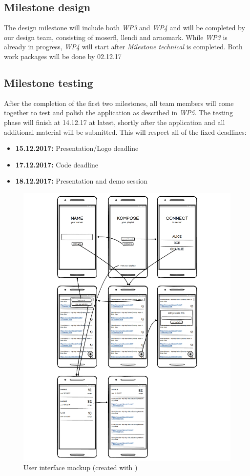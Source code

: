 \documentclass{report}
\begin{document}
\subsection{Milestone design}
The design milestone will include both \emph{WP3} and \emph{WP4} and will be completed by our design team, 
consisting of moserfl, llendi and arnomark. While \emph{WP3} is already in progress, \emph{WP4} will start
after \emph{Milestone technical} is completed. Both work packages will be done by 02.12.17

\subsection{Milestone testing}
After the completion of the first two milestones, all team members will come together to test and polish the application
as described in \emph{WP5}. The testing phase will finish at 14.12.17 at latest, shortly after the application and 
all additional material will be submitted. This will respect all of the fixed deadlines:

\begin{itemize}
    \item {\bf 15.12.2017:} Presentation/Logo deadline
    \item {\bf 17.12.2017:} Code deadline
    \item {\bf 18.12.2017:} Presentation and demo session
\end{itemize}



\begin{figure}
    \includegraphics[width=\textwidth]{../design/mockups.pdf}
    \caption{User interface mockup (created with \cite{balsamiq})}
\end{figure}
\end{document}
